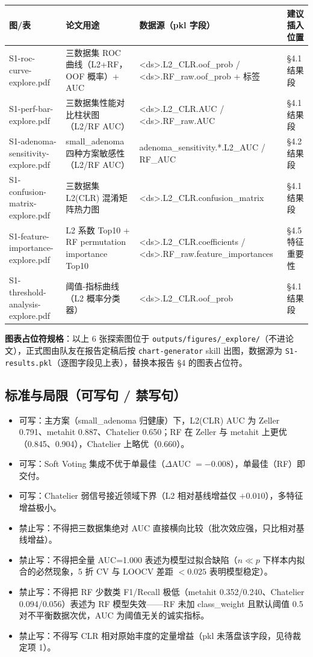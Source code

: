 \documentclass{article}
\begin{document}
\begin{center}
\scriptsize
\begin{tabular}{p{4.2cm} p{4.6cm} p{4.6cm} p{2.2cm}}
\toprule
图/表 & 论文用途 & 数据源（pkl 字段） & 建议插入位置 \\
\midrule
S1-roc-curve-explore.pdf & 三数据集 ROC 曲线（L2+RF，OOF 概率）+ AUC & <ds>.L2\_CLR.oof\_prob / <ds>.RF\_raw.oof\_prob + 标签 & §4.1 结果段 \\
S1-perf-bar-explore.pdf & 三数据集性能对比柱状图（L2/RF AUC） & <ds>.L2\_CLR.AUC / <ds>.RF\_raw.AUC & §4.1 结果段 \\
S1-adenoma-sensitivity-explore.pdf & small\_adenoma 四种方案敏感性（L2/RF AUC） & adenoma\_sensitivity.*.L2\_AUC / RF\_AUC & §4.2 结果段 \\
S1-confusion-matrix-explore.pdf & 三数据集 L2(CLR) 混淆矩阵热力图 & <ds>.L2\_CLR.confusion\_matrix & §4.1 结果段 \\
S1-feature-importance-explore.pdf & L2 系数 Top10 + RF permutation importance Top10 & <ds>.L2\_CLR.coefficients / <ds>.RF\_raw.feature\_importances & §4.5 特征重要性 \\
S1-threshold-analysis-explore.pdf & 阈值-指标曲线（L2 概率分类器） & <ds>.L2\_CLR.oof\_prob & §4.1 结果段 \\
\bottomrule
\end{tabular}
\end{center}

\textbf{图表占位符规格}：以上 6 张探索图位于 \texttt{outputs/figures/\_explore/}（不进论文），正式图由队友在报告定稿后按 \texttt{chart-generator} skill 出图，数据源为 \texttt{S1-results.pkl}（逐图字段见上表），替换本报告 §4 的图表占位符。

\subsection{标准与局限（可写句 / 禁写句）}

\begin{itemize}
  \item 可写：主方案（small\_adenoma 归健康）下，L2(CLR) AUC 为 Zeller 0.791、metahit 0.887、Chatelier 0.650；RF 在 Zeller 与 metahit 上更优（0.845、0.904），Chatelier 上略优（0.660）。
  \item 可写：Soft Voting 集成不优于单最佳（$\Delta$AUC $=-0.008$），单最佳（RF）即交付。
  \item 可写：Chatelier 弱信号接近领域下界（L2 相对基线增益仅 $+0.010$），多特征增益极小。
  \item 禁止写：不得把三数据集绝对 AUC 直接横向比较（批次效应强，只比相对基线增益）。
  \item 禁止写：不得把全量 AUC=1.000 表述为模型过拟合缺陷（$n\ll p$ 下样本内拟合的必然现象，5 折 CV 与 LOOCV 差距 $<0.025$ 表明模型稳定）。
  \item 禁止写：不得把 RF 少数类 F1/Recall 极低（metahit 0.352/0.240、Chatelier 0.094/0.056）表述为 RF 模型失效——RF 未加 class\_weight 且默认阈值 0.5 对不平衡数据次优，AUC 为阈值无关的诚实指标。
  \item 禁止写：不得写 CLR 相对原始丰度的定量增益（pkl 未落盘该字段，见待裁定项 1）。
\end{itemize}
\end{document}
